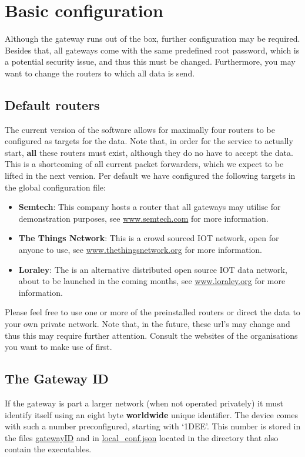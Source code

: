 \documentclass[12pt]{article}
\begin{document}
\section{Basic configuration}
Although the gateway runs out of the box, further configuration may be required. 
Besides that, all gateways come with the same predefined root password, which is a potential 
security issue, and thus this must be changed. Furthermore, you may want to change the routers 
to which all data is send.

\subsection{Default routers}
The current version of the software allows for maximally four routers to be configured as 
targets for the data. Note that, in order for the service to actually start, {\bf all} 
these routers  must exist, although they do no have to accept the data. This is a shortcoming 
of all current packet forwarders, which we expect to be lifted in the next version. 
Per default we have configured the following targets in the global configuration file:
\begin{itemize}
\item {\bf Semtech}: This company hosts a router that all gateways may utilise for demonstration purposes,
see \url{www.semtech.com} for more information. 
\item {\bf The Things Network}: This is a crowd sourced IOT network, open for anyone to use, see 
\url{www.thethingsnetwork.org} for more information.
\item {\bf Loraley}: The is an alternative distributed open source IOT data network, about to be 
launched  in the coming months, see \url{www.loraley.org} for more information.
\end{itemize}
Please feel free to use one or more of the preinstalled routers or direct the data to your
own private network. Note that, in the future, these url's may change and thus this may require
further attention. Consult the websites of the organisations you want to make
use of first.

\subsection{The Gateway ID}
If the gateway is part a larger network (when not operated privately) it must identify itself 
using an eight byte {\bf worldwide} unique identifier. The device comes with such a number 
preconfigured, starting with `1DEE'. This number is stored in the files \url{gatewayID}
and in \url{local_conf.json} located in the directory that also contain the executables.
\end{document}
